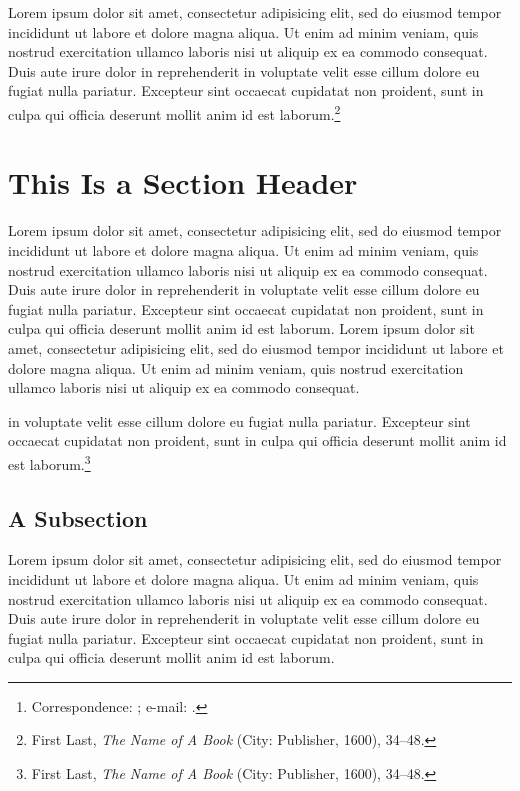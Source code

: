 \documentclass[11pt, caslon]{academic-article}
\title{\mytitle}
\date{\MakeLowercase{\mydate}}
\author{\MakeLowercase{\myauthor}\thanks{Correspondence:
	\mycorrespondence; e-mail: \href{mailto:\myemail}{\myemail}.}}
\begin{document}
\maketitle

Lorem ipsum dolor sit amet, consectetur adipisicing elit, sed do eiusmod
tempor incididunt ut labore et dolore magna aliqua. Ut enim ad minim
veniam, quis nostrud exercitation ullamco laboris nisi ut aliquip ex ea
commodo consequat. Duis aute irure dolor in reprehenderit in voluptate
velit esse cillum dolore eu fugiat nulla pariatur. Excepteur sint
occaecat cupidatat non proident, sunt in culpa qui officia deserunt
mollit anim id est laborum.\footnote{First Last, \emph{The Name of A
Book} (City: Publisher, 1600), 34--48.}

\section{This Is a Section Header}

Lorem ipsum dolor sit amet, consectetur adipisicing elit, sed do eiusmod
tempor incididunt ut labore et dolore magna aliqua. Ut enim ad minim
veniam, quis nostrud exercitation ullamco laboris nisi ut aliquip ex ea
commodo consequat. Duis aute irure dolor in reprehenderit in voluptate
velit esse cillum dolore eu fugiat nulla pariatur. Excepteur sint
occaecat cupidatat non proident, sunt in culpa qui officia deserunt
mollit anim id est laborum. Lorem ipsum dolor sit amet, consectetur
adipisicing elit, sed do eiusmod tempor incididunt ut labore et dolore
magna aliqua. Ut enim ad minim veniam, quis nostrud exercitation ullamco
laboris nisi ut aliquip ex ea commodo consequat. 

 in voluptate velit
esse cillum dolore eu fugiat nulla pariatur. Excepteur sint occaecat
cupidatat non proident, sunt in culpa qui officia deserunt mollit anim
id est laborum.\footnote{First Last, \emph{The Name of A Book} (City:
Publisher, 1600), 34--48.}

\subsection{A Subsection}

Lorem ipsum dolor sit amet, consectetur adipisicing elit, sed do eiusmod
tempor incididunt ut labore et dolore magna aliqua. Ut enim ad minim
veniam, quis nostrud exercitation ullamco laboris nisi ut aliquip ex ea
commodo consequat. Duis aute irure dolor in reprehenderit in voluptate
velit esse cillum dolore eu fugiat nulla pariatur. Excepteur sint
occaecat cupidatat non proident, sunt in culpa qui officia deserunt
mollit anim id est laborum.

\end{document}
